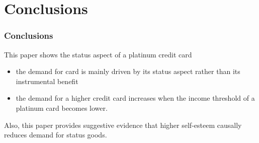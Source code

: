 \documentclass[unicode,12pt]{beamer}
\begin{document}
    \section{Conclusions}

    \begin{frame}
        \frametitle{Conclusions}
    
        This paper shows the status aspect of a platinum credit card
        \begin{itemize}
            \item the demand for card is mainly driven by its status aspect rather than its instrumental benefit 
            \item the demand for a higher credit card increases when the income threshold of a platinum card becomes lower.
        \end{itemize}
        Also, this paper provides suggestive evidence that higher self-esteem causally reduces demand for status goods.
    
    \end{frame}
\end{document}
